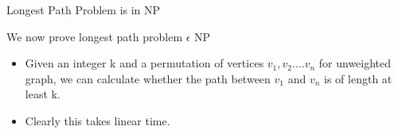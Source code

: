 
\begin{frame}{Longest Path Problem is in NP}

   
 We now prove longest path problem $\epsilon$ NP 
  \begin{itemize}
        \item<2-> Given an integer k and a permutation of vertices ${v_1,v_2....v_n}$ for unweighted graph, we can calculate whether the path between $v_1$ and $v_n$ is of length at least k.
        \item<3-> Clearly this takes linear time.
   
    
    
    \end{itemize} 

\end{frame}
